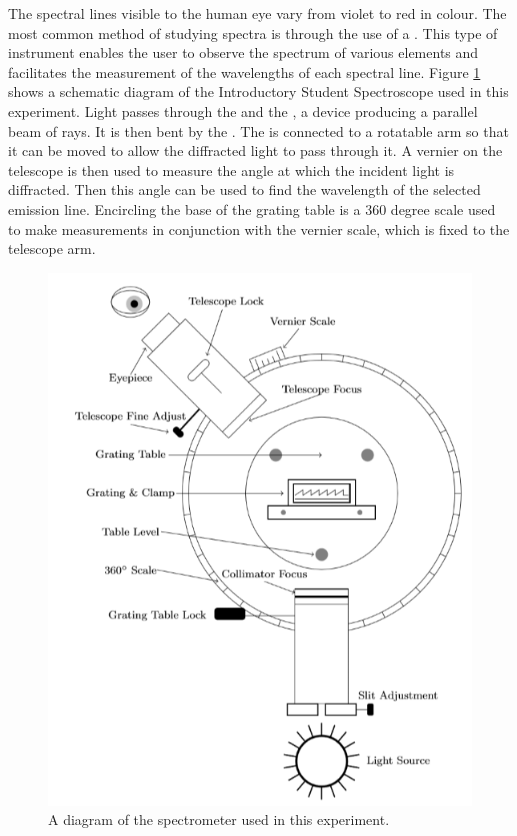\documentclass[12pt, a4paper, oneside, openright, titlepage]{book}
\begin{document}
\noindent The spectral lines visible to the human eye vary from violet to red in colour. The most common method of studying spectra is through the use of a . This type of instrument enables the user to observe the spectrum of various elements and facilitates the measurement of the wavelengths of each spectral line. Figure \ref{fig:SPEC2} shows a schematic diagram of the Introductory Student Spectroscope used in this experiment. Light passes through the  and the , a device producing a parallel beam of rays. It is then bent by the . The  is connected to a rotatable arm so that it can be moved to allow the diffracted light to pass through it. A vernier on the telescope is then used to measure the angle at which the incident light is diffracted. Then this angle can be used to find the wavelength of the selected emission line. Encircling the base of the grating table is a $360$ degree scale used to make measurements in conjunction with the vernier scale, which is fixed to the telescope arm.

\begin{figure}[H]
    \centering
    \includegraphics[scale = 0.8]{Images/SPEC2.PNG}
    \caption{A diagram of the spectrometer used in this experiment.}
    \label{fig:SPEC2}
\end{figure}
\end{document}
